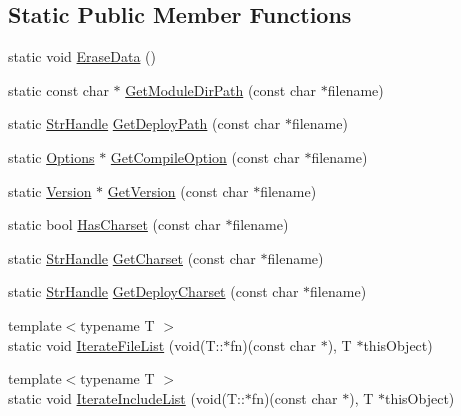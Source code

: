 \subsection*{Static Public Member Functions}
\begin{DoxyCompactItemize}
\item 
static void \hyperlink{classmocha_1_1_x_m_l_setting_info_a999115728bafc9a8779d7dae40289ad2}{EraseData} ()
\item 
static const char $\ast$ \hyperlink{classmocha_1_1_x_m_l_setting_info_a98013dbcf46677cee06fbff469307e59}{GetModuleDirPath} (const char $\ast$filename)
\item 
static \hyperlink{classmocha_1_1_array_handle}{StrHandle} \hyperlink{classmocha_1_1_x_m_l_setting_info_a963b38ab48e5c25281bb89af708ce859}{GetDeployPath} (const char $\ast$filename)
\item 
static \hyperlink{classmocha_1_1_options}{Options} $\ast$ \hyperlink{classmocha_1_1_x_m_l_setting_info_a36ec0f03350543acaa059bc7de994554}{GetCompileOption} (const char $\ast$filename)
\item 
static \hyperlink{classmocha_1_1_version}{Version} $\ast$ \hyperlink{classmocha_1_1_x_m_l_setting_info_a65b23cd1cbcd2161cb0c8d2789148d09}{GetVersion} (const char $\ast$filename)
\item 
static bool \hyperlink{classmocha_1_1_x_m_l_setting_info_a5fe7521d0a193aedb2460df55902c20f}{HasCharset} (const char $\ast$filename)
\item 
static \hyperlink{classmocha_1_1_array_handle}{StrHandle} \hyperlink{classmocha_1_1_x_m_l_setting_info_a22abef282ce35a32f3f82d616b704e88}{GetCharset} (const char $\ast$filename)
\item 
static \hyperlink{classmocha_1_1_array_handle}{StrHandle} \hyperlink{classmocha_1_1_x_m_l_setting_info_a6d7e8738a45fe0610379b02d35d1d3ce}{GetDeployCharset} (const char $\ast$filename)
\item 
{\footnotesize template$<$typename T $>$ }\\static void \hyperlink{classmocha_1_1_x_m_l_setting_info_ac5c6016757f84ce4cba4d670169234cd}{IterateFileList} (void(T::$\ast$fn)(const char $\ast$), T $\ast$thisObject)
\item 
{\footnotesize template$<$typename T $>$ }\\static void \hyperlink{classmocha_1_1_x_m_l_setting_info_a3b01a9a1809df2432abb4476bad862df}{IterateIncludeList} (void(T::$\ast$fn)(const char $\ast$), T $\ast$thisObject)
\end{DoxyCompactItemize}
